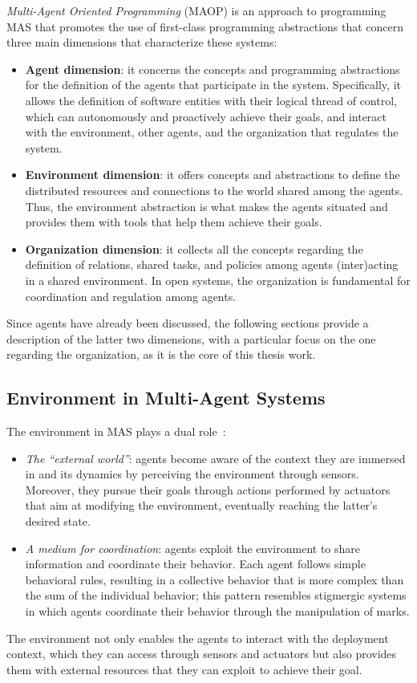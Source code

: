 \textit{Multi-Agent Oriented Programming} (MAOP) is an approach to programming MAS that promotes the use of first-class programming abstractions that concern three main dimensions that characterize these systems:~\cite{boissier2020multi}
\begin{itemize}
    \item \textbf{Agent dimension}: it concerns the concepts and programming abstractions for the definition of the agents that participate in the system.
    Specifically, it allows the definition of software entities with their logical thread of control, which can autonomously and proactively achieve their goals, and interact with the environment, other agents, and the organization that regulates the system.
    \item \textbf{Environment dimension}: it offers concepts and abstractions to define the distributed resources and connections to the world shared among the agents.
    Thus, the environment abstraction is what makes the agents situated and provides them with tools that help them achieve their goals.
    \item \textbf{Organization dimension}: it collects all the concepts regarding the definition of relations, shared tasks, and policies among agents (inter)acting in a shared environment.
    In open systems, the organization is fundamental for coordination and regulation among agents.
\end{itemize}

Since agents have already been discussed, the following sections provide a description of the latter two dimensions, with a particular focus on the one regarding the organization, as it is the core of this thesis work.

\subsection{Environment in Multi-Agent Systems}
The environment in MAS plays a dual role~\cite{weyns2007environment}:
\begin{itemize}
    \item \textit{The ``external world''}:
    agents become aware of the context they are immersed in and its dynamics by perceiving the environment through sensors.
    Moreover, they pursue their goals through actions performed by actuators that aim at modifying the environment, eventually reaching the latter's desired state.
    \item \textit{A medium for coordination}:
    agents exploit the environment to share information and coordinate their behavior.
    Each agent follows simple behavioral rules, resulting in a collective behavior that is more complex than the sum of the individual behavior; this pattern resembles stigmergic systems in which agents coordinate their behavior through the manipulation of marks.
\end{itemize}
The environment not only enables the agents to interact with the deployment context, which they can access through sensors and actuators but also provides them with external resources that they can exploit to achieve their goal.

